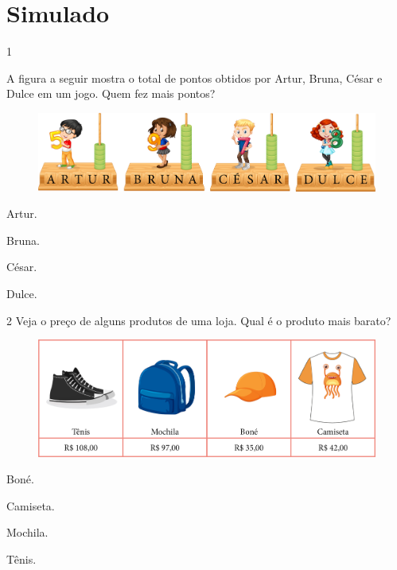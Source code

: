 \chapter[Simulado 2]{Simulado}

\num{1}

A figura a seguir mostra o total de pontos obtidos por Artur, Bruna, César
e Dulce em um jogo. Quem fez mais pontos?

\begin{figure}[H]
\includegraphics[width=\textwidth]{./media/image124.png}
\end{figure}

\begin{escolha}[itemsep=-5pt]
\item Artur.

\item Bruna.

\item César.

\item Dulce.
\end{escolha}

\num{2} Veja o preço de alguns produtos de uma loja. Qual é o produto mais
barato?

\begin{figure}[H]
\includegraphics[width=\textwidth]{./media/image125.png}
\end{figure}

\begin{escolha}[itemsep=-5pt]
\item Boné.

\item Camiseta.

\item Mochila.

\item Tênis.
\end{escolha}

